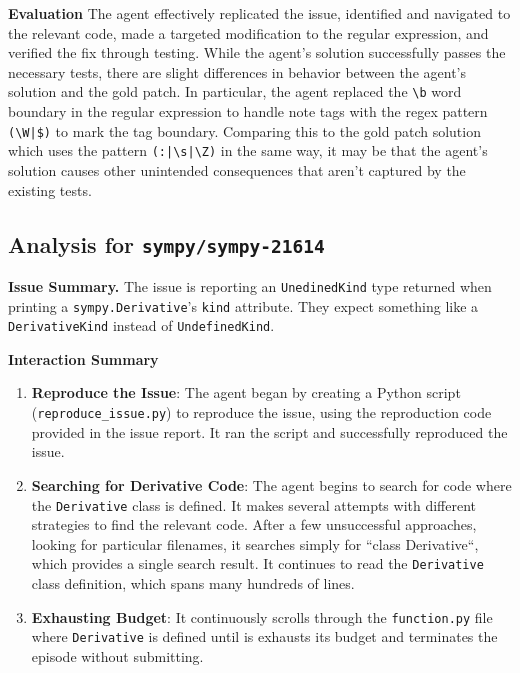 \textbf{Evaluation}
The agent effectively replicated the issue, identified and navigated to the relevant code, made a targeted modification to the regular expression, and verified the fix through testing.
While the agent's solution successfully passes the necessary tests, there are slight differences in behavior between the agent's solution and the gold patch.
In particular, the agent replaced the \texttt{\textbackslash b} word boundary in the regular expression to handle note tags with the regex pattern \texttt{(\textbackslash W|\$)} to mark the tag boundary.
Comparing this to the gold patch solution which uses the pattern \texttt{(:|\textbackslash s|\textbackslash Z)} in the same way, it may be that the agent's solution causes other unintended consequences that aren't captured by the existing tests.



\subsection*{Analysis for \texttt{sympy/sympy-21614}}

\textbf{Issue Summary.}
The issue is reporting an \texttt{UnedinedKind} type returned when printing a \texttt{sympy.Derivative}'s \texttt{kind} attribute.
They expect something like a \texttt{DerivativeKind} instead of \texttt{UndefinedKind}.

\textbf{Interaction Summary}

\begin{enumerate}
    \item \textbf{Reproduce the Issue}: The agent began by creating a Python script (\texttt{reproduce\_issue.py}) to reproduce the issue, using the reproduction code provided in the issue report.
    It ran the script and successfully reproduced the issue.
    
    \item \textbf{Searching for Derivative Code}: The agent begins to search for code where the \texttt{Derivative} class is defined.
    It makes several attempts with different strategies to find the relevant code.
    After a few unsuccessful approaches, looking for particular filenames, it searches simply for ``class Derivative``, which provides a single search result.
    It continues to read the \texttt{Derivative} class definition, which spans many hundreds of lines.    
    
    \item \textbf{Exhausting Budget}: It continuously scrolls through the \texttt{function.py} file where \texttt{Derivative} is defined until is exhausts its budget and terminates the episode without submitting.
\end{enumerate}

